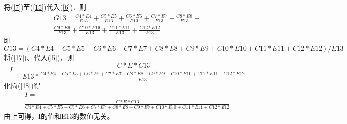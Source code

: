 将(\ref{7})至(\ref{15})代入(\ref{6})，则
\begin{multline}
    G13=\frac{C4*E4}{E13}+\frac{C5*E5}{E13}+\frac{C6*E6}{E13}+\frac{C7*E7}{E13}+\frac{C8*E8}{E13}+\\
    \frac{C9*E9}{E13}+\frac{C10*E10}{E13}+\frac{C11*E11}{E13}+\frac{C12*E12}{E13}
\end{multline}
即
\begin{equation}
    \label{17}
    G13=(C4*E4+C5*E5+C6*E6+C7*E7+C8*E8+C9*E9+C10*E10+C11*E11+C12*E12)/E13
\end{equation}
将(\ref{17})、代入(\ref{5})，则
\begin{equation}
    \label{18}
    I=\frac{C*E*C13}{E13*\frac{C4*E4+C5*E5+C6*E6+C7*E7+C8*E8+C9*E9+C10*E10+C11*E11+C12*E12}{E13}}
\end{equation}
化简(\ref{18})得
\begin{multline}
    \label{19}
    I=\\
    \frac{C*E*C13}{C4*E4+C5*E5+C6*E6+C7*E7+C8*E8+C9*E9+C10*E10+C11*E11+C12*E12}
\end{multline}
由上可得，I的值和E13的数值无关。







